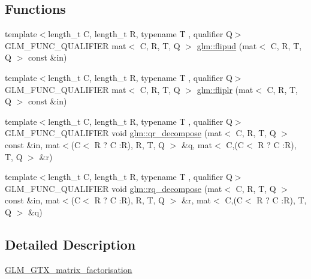\subsection*{Functions}
\begin{DoxyCompactItemize}
\item 
{\footnotesize template$<$length\+\_\+t C, length\+\_\+t R, typename T , qualifier Q$>$ }\\G\+L\+M\+\_\+\+F\+U\+N\+C\+\_\+\+Q\+U\+A\+L\+I\+F\+I\+ER mat$<$ C, R, T, Q $>$ \hyperlink{group__gtx__matrix__factorisation_ga85003371f0ba97380dd25e8905de1870}{glm\+::flipud} (mat$<$ C, R, T, Q $>$ const \&in)
\item 
{\footnotesize template$<$length\+\_\+t C, length\+\_\+t R, typename T , qualifier Q$>$ }\\G\+L\+M\+\_\+\+F\+U\+N\+C\+\_\+\+Q\+U\+A\+L\+I\+F\+I\+ER mat$<$ C, R, T, Q $>$ \hyperlink{group__gtx__matrix__factorisation_gaf39f4e5f78eb29c1a90277d45b9b3feb}{glm\+::fliplr} (mat$<$ C, R, T, Q $>$ const \&in)
\item 
{\footnotesize template$<$length\+\_\+t C, length\+\_\+t R, typename T , qualifier Q$>$ }\\G\+L\+M\+\_\+\+F\+U\+N\+C\+\_\+\+Q\+U\+A\+L\+I\+F\+I\+ER void \hyperlink{group__gtx__matrix__factorisation_ga77022dca1aa38add548f9f56a9f8071a}{glm\+::qr\+\_\+decompose} (mat$<$ C, R, T, Q $>$ const \&in, mat$<$(C$<$ R ? C \+:R), R, T, Q $>$ \&q, mat$<$ C,(C$<$ R ? C \+:R), T, Q $>$ \&r)
\item 
{\footnotesize template$<$length\+\_\+t C, length\+\_\+t R, typename T , qualifier Q$>$ }\\G\+L\+M\+\_\+\+F\+U\+N\+C\+\_\+\+Q\+U\+A\+L\+I\+F\+I\+ER void \hyperlink{group__gtx__matrix__factorisation_ga4e022709c9e7eaad9d7cc315d2cdb05c}{glm\+::rq\+\_\+decompose} (mat$<$ C, R, T, Q $>$ const \&in, mat$<$(C$<$ R ? C \+:R), R, T, Q $>$ \&r, mat$<$ C,(C$<$ R ? C \+:R), T, Q $>$ \&q)
\end{DoxyCompactItemize}


\subsection{Detailed Description}
\hyperlink{group__gtx__matrix__factorisation}{G\+L\+M\+\_\+\+G\+T\+X\+\_\+matrix\+\_\+factorisation} 